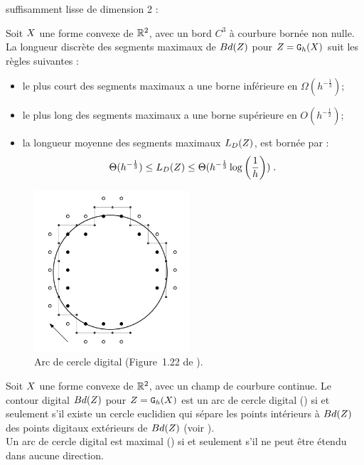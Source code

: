 suffisamment lisse de dimension 2 :
%
\begin{lemma}{}
  \label{lem:law-length-MDSS}
  Soit $X$ une forme convexe de $\mathbb{R}^2$, avec un bord $C^3$ à
  courbure bornée non nulle. La longueur discrète des segments maximaux de
  $Bd({Z})$ pour $Z = \mathtt{G}_{h}(X)$ suit les règles suivantes :
  \begin{itemize}
    \item le plus court des segments maximaux a une borne inférieure en
    $\Omega(h^{-\frac{1}{3}})$;
    \item le plus long des segments maximaux a une borne supérieure en
    $O(h^{-\frac{1}{2}})$;
    \item la longueur moyenne des segments maximaux $L_D({Z})$, est bornée par :
    \begin{equation}
      \label{eq:lengthMS}
      \Theta(h^{-\frac{1}{3}}) \le L_D( {Z} ) \le \Theta(h^{-\frac{1}{3}} \log \left(\frac{1}{h}\right))\;.
    \end{equation}
  \end{itemize}
\end{lemma}
%
\begin{figure}[ht]{
    \begin{center}
    \includegraphics[height=6cm]{images/Notions/DCA}
    \end{center}}
    \caption[Arc de cercle digital.]{Arc de cercle digital (Figure~1.22 de \cite{Roussillon2009}).\label{fig:dca-figure}}
\end{figure}
%
\begin{definition}{}
  \label{def:digital-circular-arc}
  Soit $X$ une forme convexe de $\mathbb{R}^2$, avec un champ de courbure continue.
  Le contour digital $Bd({Z})$ pour $Z = \mathtt{G}_{h}(X)$ est un arc de
  cercle digital () si et seulement s'il existe un cercle euclidien
  qui sépare les points intérieurs à $Bd({Z})$ des points digitaux extérieurs de
  $Bd({Z})$ (voir ).
  \\
  Un arc de cercle digital est maximal (\anglais{\MDCA}) si et seulement s'il ne
  peut être étendu dans aucune direction.
\end{definition}
%
